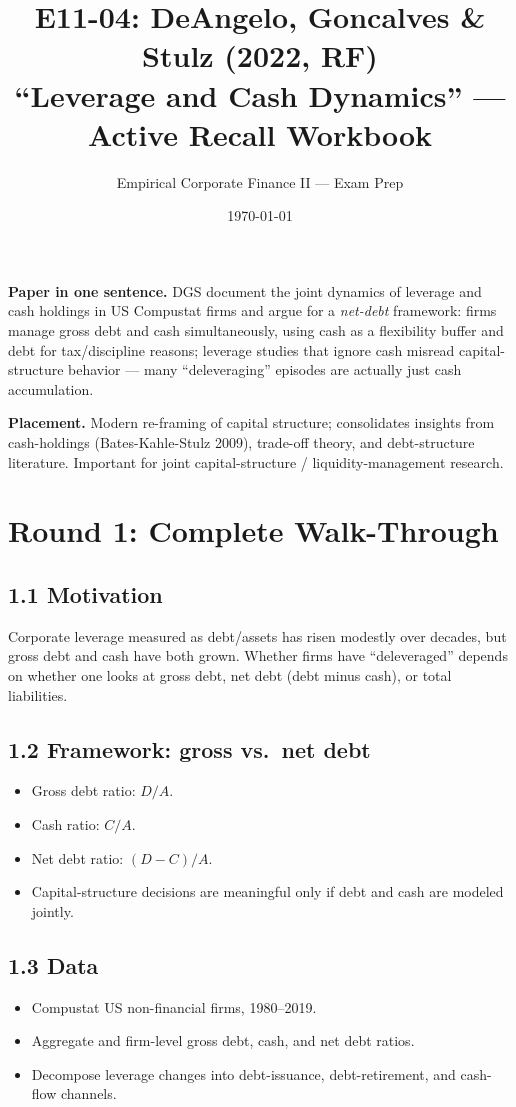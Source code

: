 \documentclass[11pt]{article}
\title{E11-04: DeAngelo, Goncalves \& Stulz (2022, RF) \\
\large ``Leverage and Cash Dynamics'' --- Active Recall Workbook}
\author{Empirical Corporate Finance II --- Exam Prep}
\date{\today}
\begin{document}
\maketitle

\begin{keybox}
\textbf{Paper in one sentence.} DGS document the joint dynamics of leverage and cash holdings in US Compustat firms and argue for a \emph{net-debt} framework: firms manage gross debt and cash simultaneously, using cash as a flexibility buffer and debt for tax/discipline reasons; leverage studies that ignore cash misread capital-structure behavior --- many ``deleveraging'' episodes are actually just cash accumulation.

\textbf{Placement.} Modern re-framing of capital structure; consolidates insights from cash-holdings (Bates-Kahle-Stulz 2009), trade-off theory, and debt-structure literature. Important for joint capital-structure / liquidity-management research.
\end{keybox}

\section*{Round 1: Complete Walk-Through}

\subsection*{1.1 Motivation}
Corporate leverage measured as debt/assets has risen modestly over decades, but gross debt and cash have both grown. Whether firms have ``deleveraged'' depends on whether one looks at gross debt, net debt (debt minus cash), or total liabilities.

\subsection*{1.2 Framework: gross vs.\ net debt}
\begin{itemize}
\item Gross debt ratio: $D/A$.
\item Cash ratio: $C/A$.
\item Net debt ratio: $(D-C)/A$.
\item Capital-structure decisions are meaningful only if debt and cash are modeled jointly.
\end{itemize}

\subsection*{1.3 Data}
\begin{itemize}
\item Compustat US non-financial firms, 1980--2019.
\item Aggregate and firm-level gross debt, cash, and net debt ratios.
\item Decompose leverage changes into debt-issuance, debt-retirement, and cash-flow channels.
\end{itemize}
\end{document}
